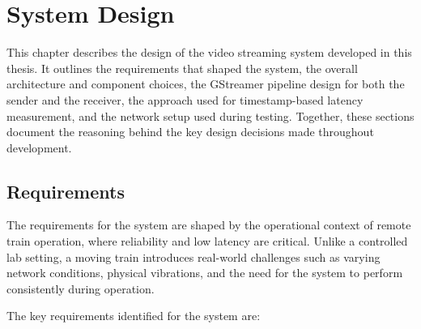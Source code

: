 \section{System Design}\label{chap:systemdesign}

This chapter describes the design of the video streaming system developed in this thesis. It outlines the requirements that shaped the system, the overall architecture and component choices, the GStreamer pipeline design for both the sender and the receiver, the approach used for timestamp-based latency measurement, and the network setup used during testing. Together, these sections document the reasoning behind the key design decisions made throughout development.

\subsection{Requirements}

The requirements for the system are shaped by the operational context of remote train operation, where reliability and low latency are critical. Unlike a controlled lab setting, a moving train introduces real-world challenges such as varying network conditions, physical vibrations, and the need for the system to perform consistently during operation.

The key requirements identified for the system are:

